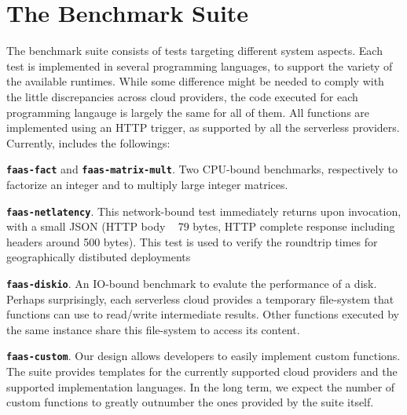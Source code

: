\section{The \sys Benchmark Suite}\label{sec:tests}
The \sys benchmark suite consists of tests targeting different system aspects.
Each test is implemented in several programming languages, to support the variety of the available runtimes.
While some difference might be needed to comply with the little discrepancies across cloud providers, the code executed for each programming langauge is largely the same for all of them.
All functions are implemented using an \gls{HTTP} trigger, as supported by all the serverless providers.
Currently, \sys includes the followings:

\textbf{\texttt{faas-fact}} and \textbf{\texttt{faas-matrix-mult}}. 
Two CPU-bound benchmarks, respectively to factorize an integer and to multiply large integer matrices.

\textbf{\texttt{faas-netlatency}}. This network-bound test immediately returns upon invocation, with a small \gls{JSON} (HTTP body ~ 79 bytes, HTTP complete response including headers around 500 bytes). This test is used to verify the roundtrip times for geographically distibuted deployments

\textbf{\texttt{faas-diskio}}. An IO-bound benchmark to evalute the performance of a disk. 
Perhaps surprisingly, each serverless cloud provides a temporary file-system that functions can use to read/write intermediate results. 
Other functions executed by the same instance share this file-system to access its content.

\textbf{\texttt{faas-custom}}. Our design allows developers to easily implement custom functions. 
The suite provides templates for the currently supported cloud providers and the supported implementation languages. 
In the long term, we expect the number of custom functions to greatly outnumber the ones provided by the suite itself.

